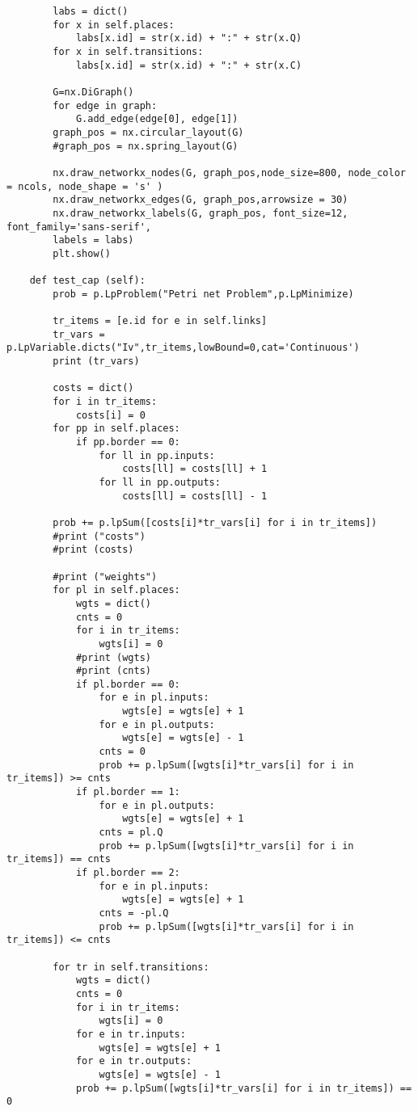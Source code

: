 \begin{verbatim}
        labs = dict()
        for x in self.places:
            labs[x.id] = str(x.id) + ":" + str(x.Q)
        for x in self.transitions:
            labs[x.id] = str(x.id) + ":" + str(x.C)

        G=nx.DiGraph()
        for edge in graph:
            G.add_edge(edge[0], edge[1])
        graph_pos = nx.circular_layout(G)
        #graph_pos = nx.spring_layout(G)
    
        nx.draw_networkx_nodes(G, graph_pos,node_size=800, node_color = ncols, node_shape = 's' )
        nx.draw_networkx_edges(G, graph_pos,arrowsize = 30)
        nx.draw_networkx_labels(G, graph_pos, font_size=12, font_family='sans-serif',
        labels = labs)
        plt.show()

    def test_cap (self):
        prob = p.LpProblem("Petri net Problem",p.LpMinimize)

        tr_items = [e.id for e in self.links]
        tr_vars = p.LpVariable.dicts("Iv",tr_items,lowBound=0,cat='Continuous')
        print (tr_vars)
        
        costs = dict()
        for i in tr_items:
            costs[i] = 0
        for pp in self.places:
            if pp.border == 0:
                for ll in pp.inputs:
                    costs[ll] = costs[ll] + 1
                for ll in pp.outputs:
                    costs[ll] = costs[ll] - 1

        prob += p.lpSum([costs[i]*tr_vars[i] for i in tr_items])
        #print ("costs")
        #print (costs)
        
        #print ("weights")
        for pl in self.places:
            wgts = dict()
            cnts = 0
            for i in tr_items:
                wgts[i] = 0
            #print (wgts)
            #print (cnts)
            if pl.border == 0:
                for e in pl.inputs:
                    wgts[e] = wgts[e] + 1
                for e in pl.outputs:
                    wgts[e] = wgts[e] - 1
                cnts = 0
                prob += p.lpSum([wgts[i]*tr_vars[i] for i in tr_items]) >= cnts
            if pl.border == 1:
                for e in pl.outputs:
                    wgts[e] = wgts[e] + 1
                cnts = pl.Q
                prob += p.lpSum([wgts[i]*tr_vars[i] for i in tr_items]) == cnts
            if pl.border == 2:
                for e in pl.inputs:
                    wgts[e] = wgts[e] + 1
                cnts = -pl.Q
                prob += p.lpSum([wgts[i]*tr_vars[i] for i in tr_items]) <= cnts

        for tr in self.transitions:
            wgts = dict()
            cnts = 0
            for i in tr_items:
                wgts[i] = 0
            for e in tr.inputs:
                wgts[e] = wgts[e] + 1
            for e in tr.outputs:
                wgts[e] = wgts[e] - 1
            prob += p.lpSum([wgts[i]*tr_vars[i] for i in tr_items]) == 0
            

\end{verbatim}
